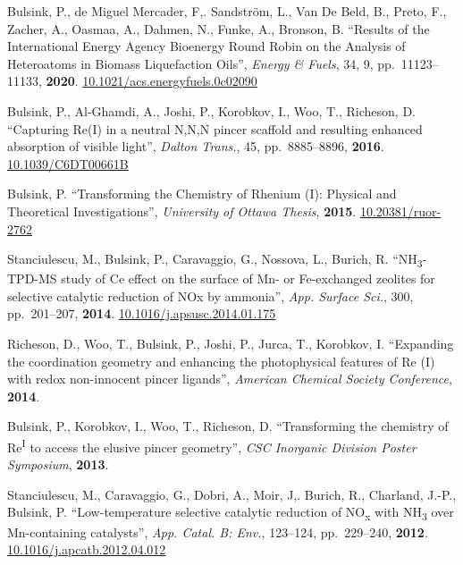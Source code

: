 \documentclass[margin,line]{resumecls}
\begin{document}
\begin{resume}
    \vspace{0mm}
    Bulsink, P., de Miguel Mercader, F,. Sandström, L., Van De Beld, B., Preto, F., Zacher, A., Oasmaa, A., Dahmen, N., Funke, A., Bronson, B. ``Results of the International Energy Agency Bioenergy Round Robin on the Analysis of Heteroatoms in Biomass Liquefaction Oils'', \textit{Energy \& Fuels}, 34, 9, pp.\ 11123--11133, \textbf{2020}. \href{https://doi.org/10.1021/acs.energyfuels.0c02090}{10.1021/acs.energyfuels.0c02090}

    \vspace{0mm}
    Bulsink, P., Al-Ghamdi, A., Joshi, P., Korobkov, I., Woo, T., Richeson, D. ``Capturing Re(I) in a neutral N,N,N pincer scaffold and resulting enhanced absorption of visible light'', \textit{Dalton Trans.}, 45, pp.\ 8885--8896, \textbf{2016}. \href{https://doi.org/10.1039/C6DT00661B}{10.1039/C6DT00661B}

     \vspace{0mm}
    Bulsink, P. ``Transforming the Chemistry of Rhenium (I): Physical and Theoretical Investigations'', \textit{University of Ottawa Thesis}, \textbf{2015}. \href{http://dx.doi.org/10.20381/ruor-2762}{10.20381/ruor-2762}

 	\vspace{0mm}
    Stanciulescu, M., Bulsink, P., Caravaggio, G., Nossova, L., Burich, R. ``NH\textsubscript{3}-TPD-MS study of Ce effect on the surface of Mn- or Fe-exchanged zeolites for selective catalytic reduction of NOx by ammonia'', \textit{App. Surface Sci.}, 300, pp.\ 201--207, \textbf{2014}. \href{https://doi.org/10.1016/j.apsusc.2014.01.175}{10.1016/j.apsusc.2014.01.175}

    \vspace{0mm}
    Richeson, D., Woo, T., Bulsink, P., Joshi, P., Jurca, T., Korobkov, I. ``Expanding the coordination geometry and enhancing the photophysical features of Re (I) with redox non-innocent pincer ligands'', \textit{American Chemical Society Conference}, \textbf{2014}.

	\vspace{0mm}
    Bulsink, P., Korobkov, I., Woo, T., Richeson, D. ``Transforming the chemistry of Re\textsuperscript{I} to access the elusive pincer geometry'', \textit{CSC Inorganic Division Poster Symposium}, \textbf{2013}.

	\vspace{0mm}
    Stanciulescu, M., Caravaggio, G., Dobri, A., Moir, J,. Burich, R., Charland, J.-P., Bulsink, P. ``Low-temperature selective catalytic reduction of NO\textsubscript{x} with NH\textsubscript{3} over Mn-containing catalysts'', \textit{App. Catal. B: Env.}, 123--124, pp.\ 229--240, \textbf{2012}. \href{https://doi.org/10.1016/j.apcatb.2012.04.012}{10.1016/j.apcatb.2012.04.012}


\end{resume}
\end{document}
